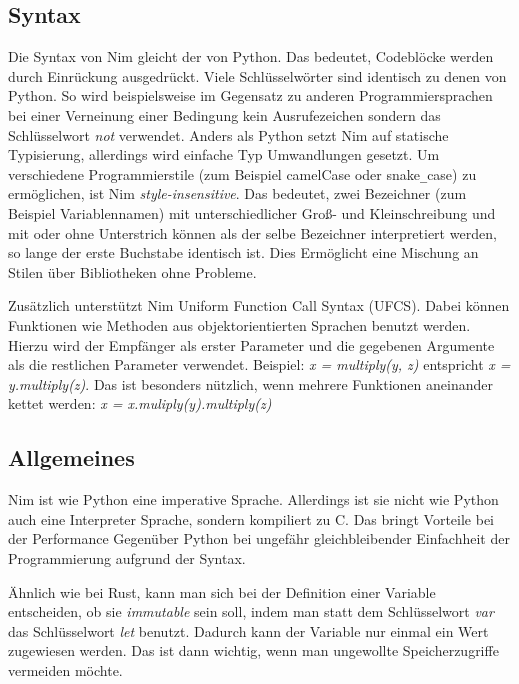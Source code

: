 \documentclass[11pt]{report}
\begin{document}
\subsection{Syntax}
Die Syntax von Nim gleicht der von Python. Das bedeutet, Codeblöcke werden durch Einrückung ausgedrückt. Viele  Schlüsselwörter sind identisch zu denen von Python. So wird beispielsweise im Gegensatz zu anderen Programmiersprachen bei einer Verneinung einer Bedingung kein Ausrufezeichen sondern das Schlüsselwort \emph{not} verwendet. Anders als Python setzt Nim auf statische Typisierung, allerdings wird einfache Typ Umwandlungen gesetzt.
\newline
Um verschiedene Programmierstile (zum Beispiel camelCase oder snake\verb|_|case) zu ermöglichen, ist Nim \emph{style-insensitive}. Das bedeutet, zwei Bezeichner (zum Beispiel Variablennamen) mit unterschiedlicher Groß- und Kleinschreibung und mit oder ohne Unterstrich können als der selbe Bezeichner interpretiert werden, so lange der erste Buchstabe identisch ist. Dies Ermöglicht eine Mischung an Stilen über Bibliotheken ohne Probleme.

Zusätzlich unterstützt Nim Uniform Function Call Syntax (UFCS). Dabei können Funktionen wie Methoden aus objektorientierten Sprachen benutzt werden. Hierzu wird der Empfänger als erster Parameter und die gegebenen Argumente als die restlichen Parameter verwendet. Beispiel:
\newline
\emph{x = multiply(y, z)} entspricht \emph{x = y.multiply(z)}.
\newline
Das ist besonders nützlich, wenn mehrere Funktionen aneinander kettet werden:
\newline
\emph{x = x.muliply(y).multiply(z)}

\subsection{Allgemeines}
Nim ist wie Python eine imperative Sprache. Allerdings ist sie nicht wie Python auch eine Interpreter Sprache, sondern kompiliert zu C. Das bringt Vorteile bei der Performance Gegenüber Python bei ungefähr gleichbleibender Einfachheit der Programmierung aufgrund der Syntax.

Ähnlich wie bei Rust, kann man sich bei der Definition einer Variable entscheiden, ob sie \emph{immutable} sein soll, indem man statt dem Schlüsselwort \emph{var} das Schlüsselwort \emph{let} benutzt. Dadurch kann der Variable nur einmal ein Wert zugewiesen werden. Das ist dann wichtig, wenn man ungewollte Speicherzugriffe vermeiden möchte.
\end{document}

